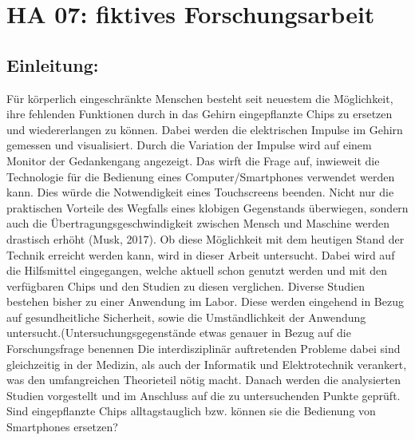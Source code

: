 \section{HA 07: fiktives Forschungsarbeit}
\subsection{Einleitung:}
Für körperlich eingeschränkte Menschen besteht seit neuestem die Möglichkeit, ihre fehlenden Funktionen durch in das Gehirn eingepflanzte Chips zu ersetzen und wiedererlangen zu können. Dabei werden die elektrischen Impulse im Gehirn gemessen und visualisiert. Durch die Variation der Impulse wird auf einem Monitor der Gedankengang angezeigt.%
Das wirft die Frage auf, inwieweit die Technologie für die Bedienung eines Computer/Smartphones verwendet werden kann.
Dies würde die Notwendigkeit eines Touchscreens beenden. Nicht nur die praktischen Vorteile des Wegfalls eines klobigen Gegenstands überwiegen, sondern auch die Übertragungsgeschwindigkeit zwischen Mensch und Maschine werden drastisch erhöht (Musk, 2017). %
Ob diese Möglichkeit mit dem heutigen Stand der Technik erreicht werden kann, wird in dieser Arbeit untersucht. Dabei wird auf die Hilfsmittel eingegangen, welche aktuell schon genutzt werden und mit den verfügbaren Chips und den Studien zu diesen verglichen. Diverse Studien bestehen bisher zu einer Anwendung im Labor. Diese werden eingehend in Bezug auf gesundheitliche Sicherheit, sowie die Umständlichkeit der Anwendung untersucht.(Untersuchungsgegenstände etwas genauer in Bezug auf die Forschungsfrage benennen
Die interdisziplinär auftretenden Probleme dabei sind gleichzeitig in der Medizin, als auch der Informatik und Elektrotechnik verankert, was den umfangreichen Theorieteil nötig macht. Danach werden die analysierten Studien vorgestellt und im Anschluss auf die zu untersuchenden Punkte geprüft.
Sind eingepflanzte Chips alltagstauglich bzw. können sie die Bedienung von Smartphones ersetzen?
